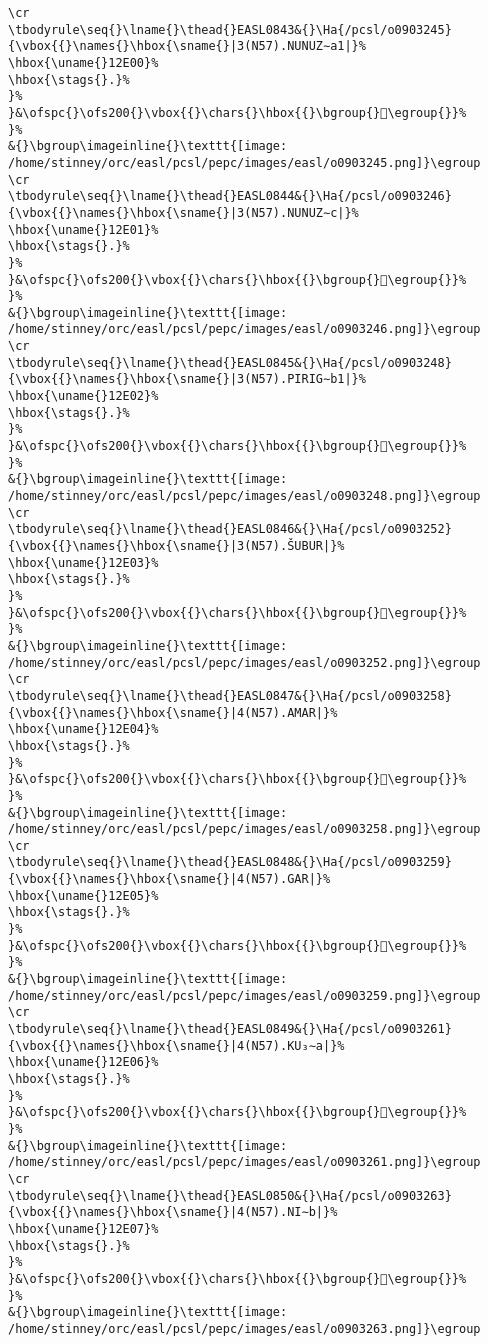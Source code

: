 \begin{verbatim}
\cr
\tbodyrule\seq{}\lname{}\thead{}EASL0843&{}\Ha{/pcsl/o0903245}{\vbox{{}\names{}\hbox{\sname{}|3(N57).NUNUZ∼a1|}%
\hbox{\uname{}12E00}%
\hbox{\stags{}.}%
}%
}&\ofspc{}\ofs200{}\vbox{{}\chars{}\hbox{{}\bgroup{}𒸀\egroup{}}%
}%
&{}\bgroup\imageinline{}\texttt{[image: /home/stinney/orc/easl/pcsl/pepc/images/easl/o0903245.png]}\egroup
\cr
\tbodyrule\seq{}\lname{}\thead{}EASL0844&{}\Ha{/pcsl/o0903246}{\vbox{{}\names{}\hbox{\sname{}|3(N57).NUNUZ∼c|}%
\hbox{\uname{}12E01}%
\hbox{\stags{}.}%
}%
}&\ofspc{}\ofs200{}\vbox{{}\chars{}\hbox{{}\bgroup{}𒸁\egroup{}}%
}%
&{}\bgroup\imageinline{}\texttt{[image: /home/stinney/orc/easl/pcsl/pepc/images/easl/o0903246.png]}\egroup
\cr
\tbodyrule\seq{}\lname{}\thead{}EASL0845&{}\Ha{/pcsl/o0903248}{\vbox{{}\names{}\hbox{\sname{}|3(N57).PIRIG∼b1|}%
\hbox{\uname{}12E02}%
\hbox{\stags{}.}%
}%
}&\ofspc{}\ofs200{}\vbox{{}\chars{}\hbox{{}\bgroup{}𒸂\egroup{}}%
}%
&{}\bgroup\imageinline{}\texttt{[image: /home/stinney/orc/easl/pcsl/pepc/images/easl/o0903248.png]}\egroup
\cr
\tbodyrule\seq{}\lname{}\thead{}EASL0846&{}\Ha{/pcsl/o0903252}{\vbox{{}\names{}\hbox{\sname{}|3(N57).ŠUBUR|}%
\hbox{\uname{}12E03}%
\hbox{\stags{}.}%
}%
}&\ofspc{}\ofs200{}\vbox{{}\chars{}\hbox{{}\bgroup{}𒸃\egroup{}}%
}%
&{}\bgroup\imageinline{}\texttt{[image: /home/stinney/orc/easl/pcsl/pepc/images/easl/o0903252.png]}\egroup
\cr
\tbodyrule\seq{}\lname{}\thead{}EASL0847&{}\Ha{/pcsl/o0903258}{\vbox{{}\names{}\hbox{\sname{}|4(N57).AMAR|}%
\hbox{\uname{}12E04}%
\hbox{\stags{}.}%
}%
}&\ofspc{}\ofs200{}\vbox{{}\chars{}\hbox{{}\bgroup{}𒸄\egroup{}}%
}%
&{}\bgroup\imageinline{}\texttt{[image: /home/stinney/orc/easl/pcsl/pepc/images/easl/o0903258.png]}\egroup
\cr
\tbodyrule\seq{}\lname{}\thead{}EASL0848&{}\Ha{/pcsl/o0903259}{\vbox{{}\names{}\hbox{\sname{}|4(N57).GAR|}%
\hbox{\uname{}12E05}%
\hbox{\stags{}.}%
}%
}&\ofspc{}\ofs200{}\vbox{{}\chars{}\hbox{{}\bgroup{}𒸅\egroup{}}%
}%
&{}\bgroup\imageinline{}\texttt{[image: /home/stinney/orc/easl/pcsl/pepc/images/easl/o0903259.png]}\egroup
\cr
\tbodyrule\seq{}\lname{}\thead{}EASL0849&{}\Ha{/pcsl/o0903261}{\vbox{{}\names{}\hbox{\sname{}|4(N57).KU₃∼a|}%
\hbox{\uname{}12E06}%
\hbox{\stags{}.}%
}%
}&\ofspc{}\ofs200{}\vbox{{}\chars{}\hbox{{}\bgroup{}𒸆\egroup{}}%
}%
&{}\bgroup\imageinline{}\texttt{[image: /home/stinney/orc/easl/pcsl/pepc/images/easl/o0903261.png]}\egroup
\cr
\tbodyrule\seq{}\lname{}\thead{}EASL0850&{}\Ha{/pcsl/o0903263}{\vbox{{}\names{}\hbox{\sname{}|4(N57).NI∼b|}%
\hbox{\uname{}12E07}%
\hbox{\stags{}.}%
}%
}&\ofspc{}\ofs200{}\vbox{{}\chars{}\hbox{{}\bgroup{}𒸇\egroup{}}%
}%
&{}\bgroup\imageinline{}\texttt{[image: /home/stinney/orc/easl/pcsl/pepc/images/easl/o0903263.png]}\egroup

\end{verbatim}
